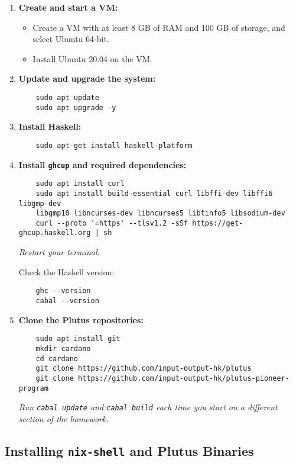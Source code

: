 \begin{enumerate}
    \item \textbf{Create and start a VM:}
    \begin{itemize}
        \item Create a VM with at least 8 GB of RAM and 100 GB of storage, and select Ubuntu 64-bit.
        \item Install Ubuntu 20.04 on the VM.
    \end{itemize}
    
    \item \textbf{Update and upgrade the system:}
    \begin{verbatim}
    sudo apt update
    sudo apt upgrade -y
    \end{verbatim}
    
    \item \textbf{Install Haskell:}
    \begin{verbatim}
    sudo apt-get install haskell-platform
    \end{verbatim}
    
    \item \textbf{Install \texttt{ghcup} and required dependencies:}
    \begin{verbatim}
    sudo apt install curl
    sudo apt install build-essential curl libffi-dev libffi6 libgmp-dev 
    libgmp10 libncurses-dev libncurses5 libtinfo5 libsodium-dev
    curl --proto '=https' --tlsv1.2 -sSf https://get-ghcup.haskell.org | sh
    \end{verbatim}
    \textit{Restart your terminal.}
    
    Check the Haskell version:
    \begin{verbatim}
    ghc --version
    cabal --version
    \end{verbatim}
    
    \item \textbf{Clone the Plutus repositories:}
    \begin{verbatim}
    sudo apt install git
    mkdir cardano
    cd cardano
    git clone https://github.com/input-output-hk/plutus
    git clone https://github.com/input-output-hk/plutus-pioneer-program
    \end{verbatim}
    \textit{Run \texttt{cabal update} and \texttt{cabal build} each time you start on a different section of the homework.}
\end{enumerate}

\subsection{Installing \texttt{nix-shell} and Plutus Binaries}

